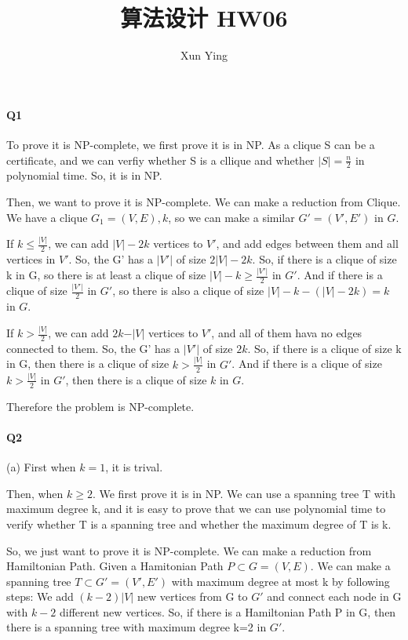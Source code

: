 \documentclass[UTF8]{ctexart}
\renewcommand{\(}{\left(}
\renewcommand{\)}{\right)}
\begin{document}
\title{算法设计 HW06}  
\author{Xun Ying}
\maketitle

\paragraph{Q1} 

To prove it is NP-complete, we first prove it is in NP. As a clique S can be a certificate, and we
can verfiy whether S is a cllique and whether $\vert S \vert = \frac{n}{2}$ in polynomial time. So, it is in NP.

Then, we want to prove it is NP-complete. We can make a reduction from Clique. 
We have a clique $G_{1} = (V, E), k$, so we can make a similar $G' = (V', E')$ in $G$.

If $k \leq \frac{\vert V \vert}{2}$, we can add $\vert V \vert - 2k$ vertices to $V'$, and add edges between them and all vertices in $V'$.
So, the G' has a $\vert V' \vert$ of size $2\vert V \vert - 2k$. So, if there is a clique of size k in G,
so there is at least a clique of size $\vert V \vert - k \geq \frac{\vert V' \vert}{2}$ in $G'$. And if there is a 
clique of size $\frac{\vert V' \vert}{2}$ in $G'$, so there is also a clique of size $\vert V \vert - k -(\vert V \vert -2k) = k$ in $G$.

If $k > \frac{\vert V \vert}{2}$, we can add $2k - \vert V \vert$ vertices to $V'$, and all of them hava no edges connected to them.
So, the G' has a $\vert V' \vert$ of size $2k$. So, if there is a clique of size k in G, then there is a clique of size $k > \frac{\vert V \vert}{2}$ in $G'$.
And if there is a clique of size $k > \frac{\vert V \vert}{2}$ in $G'$, then there is a clique of size $k$ in $G$.

Therefore the problem is NP-complete.

\paragraph{Q2}

(a) First when $k = 1$, it is trival.

Then, when $k \geq 2$. We first prove it is in NP. We can use a spanning tree T with maximum degree k, and
it is easy to prove that we can use polynomial time to verify whether T is a spanning tree and whether the maximum degree of T is k.

So, we just want to prove it is NP-complete. We can make a reduction from Hamiltonian Path. Given a Hamitonian Path $P \subset G= (V, E)$.
We can make a spanning tree $T \subset G' = (V', E')$ with maximum degree at most k by following steps: We add $(k-2)\vert V \vert$ new vertices
from G to $G'$ and connect each node in G with $k-2$ different new vertices. So, if there is a Hamiltonian Path P in G, then there is a spanning tree with maximum degree k=2 in $G'$.
\end{document}
